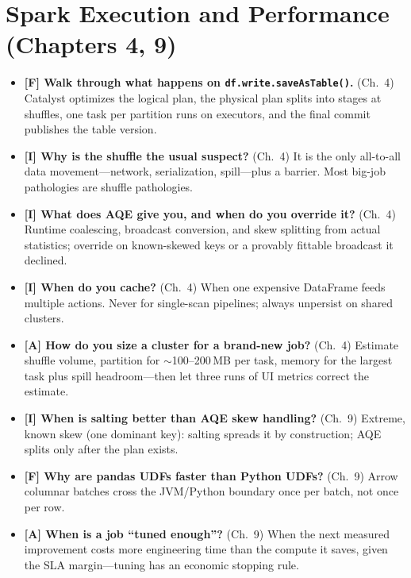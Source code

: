 \section{Spark Execution and Performance (Chapters 4, 9)}
%
\begin{itemize}
    \item \textbf{[F] Walk through what happens on \texttt{df.write.saveAsTable()}.} (Ch.~4)
    Catalyst optimizes the logical plan, the physical plan splits into stages at shuffles,
    one task per partition runs on executors, and the final commit publishes the table
    version.
    \item \textbf{[I] Why is the shuffle the usual suspect?} (Ch.~4) It is the only all-to-all
    data movement---network, serialization, spill---plus a barrier. Most big-job pathologies
    are shuffle pathologies.
    \item \textbf{[I] What does AQE give you, and when do you override it?} (Ch.~4) Runtime
    coalescing, broadcast conversion, and skew splitting from actual statistics; override on
    known-skewed keys or a provably fittable broadcast it declined.
    \item \textbf{[I] When do you cache?} (Ch.~4) When one expensive DataFrame feeds multiple
    actions. Never for single-scan pipelines; always unpersist on shared clusters.
    \item \textbf{[A] How do you size a cluster for a brand-new job?} (Ch.~4) Estimate shuffle
    volume, partition for $\sim$100--200\,MB per task, memory for the largest task plus spill
    headroom---then let three runs of UI metrics correct the estimate.
    \item \textbf{[I] When is salting better than AQE skew handling?} (Ch.~9) Extreme, known
    skew (one dominant key): salting spreads it by construction; AQE splits only after the
    plan exists.
    \item \textbf{[F] Why are pandas UDFs faster than Python UDFs?} (Ch.~9) Arrow columnar
    batches cross the JVM/Python boundary once per batch, not once per row.
    \item \textbf{[A] When is a job ``tuned enough''?} (Ch.~9) When the next measured
    improvement costs more engineering time than the compute it saves, given the SLA
    margin---tuning has an economic stopping rule.
\end{itemize}

